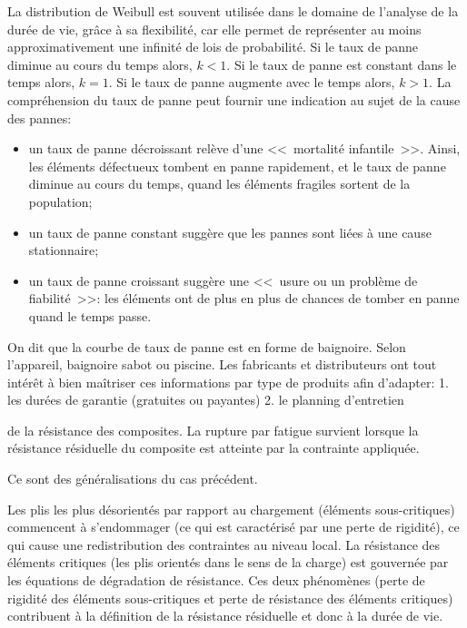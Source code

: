\begin{description}
{\medskip
La distribution de Weibull est souvent utilisée dans le domaine de l'analyse de la durée de vie,
grâce à sa flexibilité, car elle permet de représenter au moins approximativement une
infinité de lois de probabilité.
Si le taux de panne diminue au cours du temps alors, $k < 1$.
 Si le taux de panne est constant dans le temps alors, $k = 1$.
Si le taux de panne augmente avec le temps alors, $k > 1$.
La compréhension du taux de panne peut fournir une indication au sujet de la cause des pannes:
\begin{itemize}
	\item un taux de panne décroissant relève d'une <<~mortalité infantile~>>. Ainsi, les
		éléments défectueux tombent en panne rapidement, et le taux de panne diminue
		au cours du temps, quand les éléments fragiles sortent de la population;
	\item un taux de panne constant suggère que les pannes sont liées à une cause stationnaire;
	\item un taux de panne croissant suggère une <<~usure ou un problème de fiabilité~>>:
		les éléments ont de plus en plus de chances de tomber en panne quand le temps passe.
\end{itemize}
On dit que la courbe de taux de panne est en forme de baignoire. Selon l'appareil, baignoire sabot ou piscine.
Les fabricants et distributeurs ont tout intérêt à bien maîtriser ces informations par type de produits
afin d'adapter:
  1. les durées de garantie (gratuites ou payantes)
  2. le planning d'entretien}%
de la résistance des composites. La rupture par fatigue survient lorsque la résistance résiduelle du composite est atteinte par la contrainte appliquée.

  \item[\textcolorblue{\em Théories de perte de rigidité}] Ce sont des généralisations
     du cas précédent.

     Les plis les plus désorientés par rapport au chargement
     (éléments sous-critiques) commencent à s'endommager (ce
     qui est caractérisé par une perte de rigidité), ce qui cause
     une redistribution des contraintes au niveau local.
     La résistance des éléments critiques (les plis orientés
     dans le sens de la charge) est gouvernée par les équations
     de dégradation de résistance.
     Ces deux phénomènes (perte de rigidité des éléments
     sous-critiques et perte de résistance des éléments critiques)
     contribuent à la définition de la résistance résiduelle
     et donc à la durée de vie.


\end{description}
